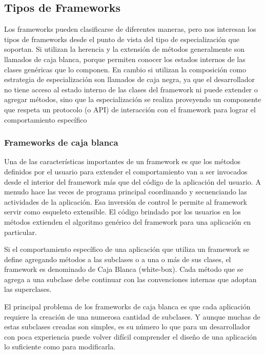 \subsection{Tipos de Frameworks}

    Los frameworks pueden clasificarse de diferentes maneras, pero nos interesan los tipos de frameworks desde el punto de vista del tipo de especialización que soportan. Si utilizan la herencia y la extensión de métodos generalmente son llamados de caja blanca, porque permiten conocer los estados internos de las clases genéricas que lo componen. En cambio si utilizan la composición como estrategia de especialización son llamados de caja negra, ya que el desarrollador no tiene acceso al estado interno de las clases del framework ni puede extender o agregar métodos, sino que la especialización se realiza proveyendo un componente que respeta un protocolo (o API) de interacción con el framework para lograr el comportamiento específico


\subsubsection{Frameworks de caja blanca}

	Una de las características importantes de un framework es que los métodos definidos por el usuario para extender el comportamiento van a ser invocados desde el interior del framework más que del código de la aplicación del usuario. A menudo hace las veces de programa principal coordinando y secuenciando las actividades de la aplicación. Esa inversión de control le permite al framework servir como esqueleto extensible. El código brindado por los usuarios en los métodos extienden el algoritmo genérico del framework para una aplicación en particular. 
	
	Si el comportamiento específico de una aplicación que utiliza un framework se define agregando métodos a las subclases o a una o más de sus clases, el framework es denominado de Caja Blanca (white-box). Cada método que se agrega a una subclase debe continuar con las convenciones internas que adoptan las superclases. 
	
	El principal problema de los frameworks de caja blanca es que cada aplicación requiere la creación de una numerosa cantidad  de subclases. Y aunque muchas de estas subclases creadas son simples, es su número lo que para un desarrollador con poca experiencia puede volver difícil comprender el diseño de una aplicación lo suficiente como para modificarla.
	

